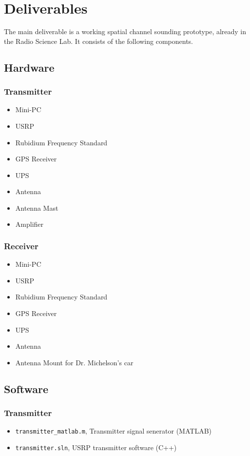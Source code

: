 \chapter{Deliverables}
The main deliverable is a working spatial channel sounding prototype, already in the Radio Science Lab. It consists of the following components.
\section{Hardware}
\subsection{Transmitter}
   \begin{itemize}
   \itemsep-1em 
      \item Mini-PC
      \item USRP
      \item Rubidium Frequency Standard
      \item GPS Receiver
      \item UPS
      \item Antenna
      \item Antenna Mast
      \item Amplifier
   \end{itemize}
\subsection{Receiver}
   \begin{itemize}
   \itemsep-1em 
      \item Mini-PC
      \item USRP
      \item Rubidium Frequency Standard
      \item GPS Receiver
      \item UPS
      \item Antenna
      \item Antenna Mount for Dr. Michelson's car
   \end{itemize}
\section{Software}
   \subsection{Transmitter}
      \begin{itemize}
      \itemsep-1em 
         \item \texttt{transmitter\_matlab.m}, Transmitter signal senerator (MATLAB)
         \item \texttt{transmitter.sln}, USRP transmitter software (C++)
      \end{itemize}
